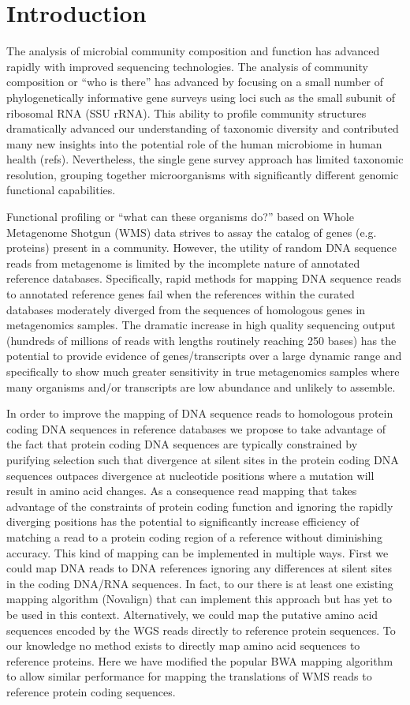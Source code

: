 \section{Introduction} 
The analysis of microbial community composition and function has advanced rapidly with improved sequencing technologies.  The analysis of community composition or “who is there” has advanced by focusing on a small number of phylogenetically informative gene surveys using loci such as the small subunit of ribosomal RNA (SSU rRNA). This ability to profile community structures dramatically advanced our understanding of taxonomic diversity and contributed many new insights into the potential role of the human microbiome in human health (refs).  Nevertheless, the single gene survey approach has limited taxonomic resolution, grouping together microorganisms with significantly different genomic functional capabilities. 

Functional profiling or “what can these organisms do?” based on Whole Metagenome Shotgun (WMS) data strives to assay the catalog of genes (e.g. proteins) present in a community.  However, the utility of random DNA sequence reads from metagenome is limited by the incomplete nature of annotated reference databases.  Specifically, rapid methods for mapping DNA sequence reads to annotated reference genes fail when the references within the curated databases moderately diverged from the sequences of homologous genes in metagenomics samples.  The dramatic increase in high quality sequencing output (hundreds of millions of reads with lengths routinely reaching 250 bases) has the potential to provide evidence of genes/transcripts over a large dynamic range and specifically to show much greater sensitivity in true metagenomics samples where many organisms and/or transcripts are low abundance and unlikely to assemble.  

In order to improve the mapping of DNA sequence reads to homologous protein coding DNA sequences in reference databases we propose to take advantage of the fact that protein coding DNA sequences are typically constrained by purifying selection such that divergence at silent sites in the protein coding DNA sequences outpaces divergence at nucleotide positions where a mutation will result in amino acid changes.  As a consequence read mapping that takes advantage of the constraints of protein coding function and ignoring the rapidly diverging positions has the potential to significantly increase efficiency of matching a read to a protein coding region of a reference without diminishing accuracy.  This kind of mapping can be implemented in multiple ways. First we could map DNA reads to DNA references ignoring any differences at silent sites in the coding DNA/RNA sequences.   In fact, to our there is at least one existing mapping algorithm (Novalign) that can implement this approach but has yet to be used in this context. Alternatively, we could map the putative amino acid sequences encoded by the WGS reads directly to reference protein sequences.  To our knowledge no method exists to directly map amino acid sequences to reference proteins.  Here we have modified the popular BWA mapping algorithm to allow similar performance for mapping the translations of WMS reads to reference protein coding sequences.  

